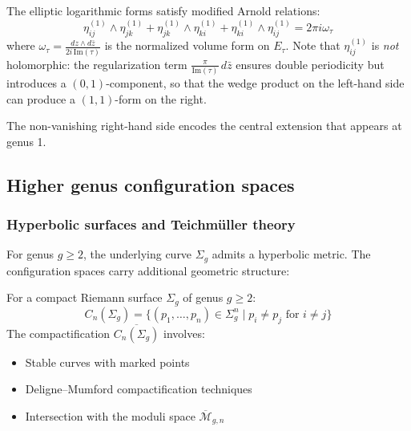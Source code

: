 \begin{proposition}
\label{prop:elliptic-arnold-relations}
The elliptic logarithmic forms satisfy modified Arnold relations:
\[
\eta_{ij}^{(1)} \wedge \eta_{jk}^{(1)} + \eta_{jk}^{(1)} \wedge \eta_{ki}^{(1)} + \eta_{ki}^{(1)} \wedge \eta_{ij}^{(1)} = 2\pi i \omega_\tau
\]
where $\omega_\tau = \frac{dz \wedge d\bar{z}}{2i\,\mathrm{Im}(\tau)}$ is the normalized volume form on $E_\tau$. Note that $\eta_{ij}^{(1)}$ is \emph{not} holomorphic: the regularization term $\frac{\pi}{\mathrm{Im}(\tau)}\,d\bar{z}$ ensures double periodicity but introduces a $(0,1)$-component, so that the wedge product on the left-hand side can produce a $(1,1)$-form on the right.
\end{proposition}

The non-vanishing right-hand side encodes the central extension that appears at genus 1.

\subsection{Higher genus configuration spaces}

\subsubsection{Hyperbolic surfaces and Teichmüller theory}

For genus $g \geq 2$, the underlying curve $\Sigma_g$ admits a hyperbolic metric. The configuration spaces carry additional geometric structure:

\begin{definition}
For a compact Riemann surface $\Sigma_g$ of genus $g \geq 2$:
\[
C_n(\Sigma_g) = \{(p_1, \ldots, p_n) \in \Sigma_g^n \mid p_i \neq p_j \text{ for } i \neq j\}
\]
The compactification $\overline{C_n(\Sigma_g)}$ involves:
\begin{itemize}
\item Stable curves with marked points
\item Deligne--Mumford compactification techniques
\item Intersection with the moduli space $\overline{\mathcal{M}}_{g,n}$
\end{itemize}
\end{definition}

